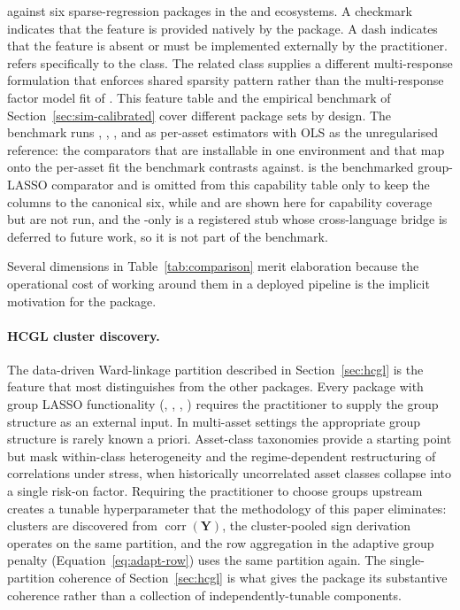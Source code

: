 \documentclass[article]{jss}
\begin{document}
\begin{table}[ht]
{	against six sparse-regression packages in the  and
	 ecosystems. A checkmark indicates that the feature is
	provided natively by the package. A dash indicates that the feature
	is absent or must be implemented externally by the practitioner.
	 refers specifically to the  class. The
	related  class supplies a different multi-response
	formulation that enforces shared sparsity pattern rather than the
	multi-response factor model fit of . This feature
	table and the empirical benchmark of
	Section~\ref{sec:sim-calibrated} cover different package sets by
	design. The benchmark runs , , , and  as per-asset estimators with OLS as the unregularised reference: the comparators that are installable in one
	 environment and that map onto the per-asset fit
	the benchmark contrasts against.  is the benchmarked
	group-LASSO comparator and is omitted from this capability table
	only to keep the columns to the canonical six, while  and  are shown here for capability coverage but are not run, and the -only 
	is a registered stub whose cross-language bridge is deferred to
	future work, so it is not part of the benchmark.}
\end{table}

Several dimensions in Table~\ref{tab:comparison} merit elaboration
because the operational cost of working around them in a deployed
pipeline is the implicit motivation for the  package.

\paragraph{HCGL cluster discovery.}
The data-driven Ward-linkage partition described in
Section~\ref{sec:hcgl} is the feature that most distinguishes
 from the other packages. Every package with group LASSO functionality
(, , , ) requires the
practitioner to supply the group structure as an external input. In
multi-asset settings the appropriate group structure is rarely known
a priori. Asset-class taxonomies provide a starting point but mask
within-class heterogeneity and the regime-dependent restructuring of
correlations under stress, when historically uncorrelated asset
classes collapse into a single risk-on factor. Requiring the
practitioner to choose groups upstream creates a tunable
hyperparameter that the methodology of this paper eliminates: clusters
are discovered from $\operatorname{corr}(\bm{Y})$, the cluster-pooled
sign derivation operates on the same partition, and the row
aggregation in the adaptive group penalty
(Equation~\ref{eq:adapt-row}) uses the same partition again. The
single-partition coherence of Section~\ref{sec:hcgl} is what gives
the package its substantive coherence rather than a collection of
independently-tunable components.
\end{document}

